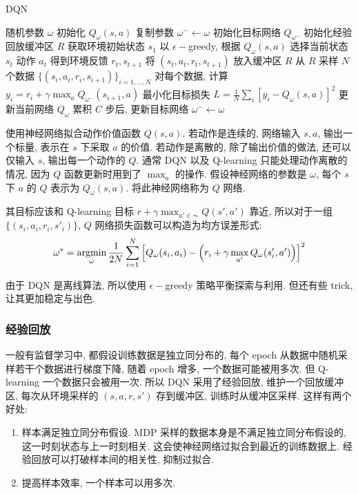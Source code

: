\begin{algorithm}[htb]
    \caption{DQN}
    \begin{algorithmic}
        \State 随机参数 $\omega$ 初始化 $Q_\omega(s,a)$
        \State 复制参数 $\omega^-\leftarrow \omega$ 初始化目标网络 $Q_{\omega^-}$
        \State 初始化经验回放缓冲区 $R$
            \State 获取环境初始状态 $s_1$
                \State 以 $\epsilon-$greedy, 根据 $Q_\omega(s,a)$ 选择当前状态 $s_t$ 动作 $a_t$
                \State 得到环境反馈 $r_t, s_{t+1}$
                \State 将 $(s_t,a_t,r_t,s_{t+1})$ 放入缓冲区 $R$
                    \State 从 $R$ 采样 $N$ 个数据 $\{ (s_i,a_i,r_i,s_{i+1}) \}_{i=1,\dots,N}$
                    \State 对每个数据, 计算 $\displaystyle y_i=r_i+\gamma \max_a Q_{\omega^-}(s_{i+1}, a)$
                    \State 最小化目标损失 $\displaystyle L=\frac{1}{N}\sum_i \left[y_i - Q_\omega(s,a)\right]^2$
                    \State 更新当前网络 $Q_\omega$
                    \State 累积 $C$ 步后, 更新目标网络 $\omega^-\leftarrow \omega$
                \EndIf
            \EndFor
        \EndFor
    \end{algorithmic}
\end{algorithm}

使用神经网络拟合动作价值函数 $Q(s,a)$. 若动作是连续的, 网络输入 $s,a$, 输出一个标量, 表示在 $s$ 下采取 $a$ 的价值. 若动作是离散的, 除了输出价值的做法, 还可以仅输入 $s$, 输出每一个动作的 $Q$. 通常 DQN 以及 Q-learning 只能处理动作离散的情况, 因为 $Q$ 函数更新时用到了 $\max_a$ 的操作. 假设神经网络的参数是 $\omega$, 每个 $s$ 下 $a$ 的 $Q$ 表示为 $Q_\omega (s,a)$. 将此神经网络称为 $Q$ 网络. 

其目标应该和 Q-learning 目标 $r+\gamma \max_{a'\in\AC}Q(s',a')$ 靠近, 所以对于一组 $\{ (s_i, a_i, r_i, s'_i) \}$, $Q$ 网络损失函数可以构造为均方误差形式:
\begin{align*}
    \omega^* = \operatorname*{argmin}_\omega \frac{1}{2N}\sum_{i=1}^N\left[ Q_\omega(s_i, a_i) - \left( r_i + \gamma \max_{a'} Q_\omega (s'_i, a') \right) \right]^2
\end{align*}

由于 DQN 是离线算法, 所以使用 $\epsilon-$greedy 策略平衡探索与利用. 但还有些 trick, 让其更加稳定与出色. 

\subsubsection{经验回放}
一般有监督学习中, 都假设训练数据是独立同分布的, 每个 epoch 从数据中随机采样若干个数据进行梯度下降, 随着 epoch 增多, 一个数据可能被用多次. 但 Q-learning 一个数据只会被用一次. 所以 DQN 采用了经验回放, 维护一个回放缓冲区, 每次从环境采样的 $(s,a,r,s')$ 存到缓冲区, 训练时从缓冲区采样. 这样有两个好处:
\begin{enumerate}
    \item 样本满足独立同分布假设. MDP 采样的数据本身是不满足独立同分布假设的, 这一时刻状态与上一时刻相关. 这会使神经网络过拟合到最近的训练数据上. 经验回放可以打破样本间的相关性, 抑制过拟合.
    \item 提高样本效率, 一个样本可以用多次. 
\end{enumerate}


